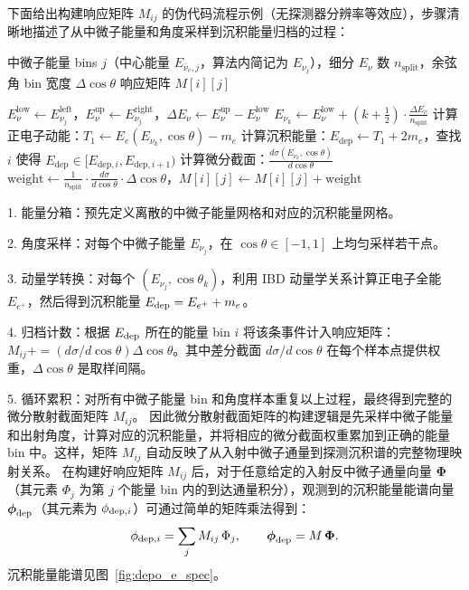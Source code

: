 下面给出构建响应矩阵 $M_{ij}$ 的伪代码流程示例（无探测器分辨率等效应），步骤清晰地描述了从中微子能量和角度采样到沉积能量归档的过程：
\begin{algorithm}[htbp]
\caption{生成响应矩阵 $M[i][j]$ 的伪代码}
\begin{algorithmic}[1]
\Require 中微子能量 bins $j$（中心能量 $E_{\bar{\nu}_e,j}$，算法内简记为 $E_{\nu_j}$），细分 $E_\nu$ 数 $n_{\text{split}}$，余弦角 bin 宽度 $\Delta\cos\theta$
\Ensure 响应矩阵 $M[i][j]$

  \State $E_{\nu}^{\text{low}} \gets E_{\nu_j}^{\text{left}}$，$E_{\nu}^{\text{up}} \gets E_{\nu_j}^{\text{right}}$，$\Delta E_\nu \gets E_{\nu}^{\text{up}} - E_{\nu}^{\text{low}}$
    \State $E_{\nu_k} \gets E_{\nu}^{\text{low}} + \left(k + \frac{1}{2}\right) \cdot \frac{\Delta E_\nu}{n_{\text{split}}}$
      \State 计算正电子动能：$T_1 \gets E_e(E_{\nu_k}, \cos\theta) - m_e$
      \State 计算沉积能量：$E_{\text{dep}} \gets T_1 + 2m_e$，查找 $i$ 使得 $E_{\text{dep}} \in [E_{\text{dep},i}, E_{\text{dep},i+1})$
        \State 计算微分截面：$\frac{d\sigma(E_{\nu_k}, \cos\theta)}{d\cos\theta}$
        \State $\text{weight} \gets \frac{1}{n_{\text{split}}} \cdot \frac{d\sigma}{d\cos\theta} \cdot \Delta\cos\theta$，$M[i][j] \gets M[i][j] + \text{weight}$
      \EndIf
    \EndFor
  \EndFor
\EndFor
\end{algorithmic}
\end{algorithm}

1. 能量分箱：预先定义离散的中微子能量网格和对应的沉积能量网格。
    
2. 角度采样：对每个中微子能量 $E_{\nu_j}$，在 $\cos\theta\in[-1,1]$ 上均匀采样若干点。
    
3. 动量学转换：对每个 $(E_{\nu_j},\cos\theta_k)$，利用 IBD 动量学关系计算正电子全能 $E_{e^+}$，然后得到沉积能量 $E_{\rm dep}=E_{e^+}+m_e$。
    
4. 归档计数：根据 $E_{\rm dep}$ 所在的能量 bin $i$ 将该条事件计入响应矩阵：$M_{ij}+= (d\sigma/d\cos\theta)\Delta\cos\theta$。其中差分截面 $d\sigma/d\cos\theta$ 在每个样本点提供权重，$\Delta\cos\theta$ 是取样间隔。
    
5. 循环累积：对所有中微子能量 bin 和角度样本重复以上过程，最终得到完整的微分散射截面矩阵 $M_{ij}$。
因此微分散射截面矩阵的构建逻辑是先采样中微子能量和出射角度，计算对应的沉积能量，并将相应的微分截面权重累加到正确的能量 bin 中。这样，矩阵 $M_{ij}$ 自动反映了从入射中微子通量到探测沉积谱的完整物理映射关系。
在构建好响应矩阵 $M_{ij}$ 后，对于任意给定的入射反中微子通量向量 $\boldsymbol{\Phi}$（其元素 $\Phi_j$ 为第 $j$ 个能量 bin 内的到达通量积分），观测到的沉积能量能谱向量 $\boldsymbol{\phi}_{\rm dep}$（其元素为 $\phi_{{\rm dep},i}$）可通过简单的矩阵乘法得到：
\begin{equation}
\phi_{{\rm dep},i} = \sum_j M_{ij}\,\Phi_j,\qquad \boldsymbol{\phi}_{\rm dep} = M\,\boldsymbol{\Phi}.
\label{eq:phi-dep-Mij}
\end{equation}
沉积能量能谱见图~\ref{fig:depo_e_spec}。

